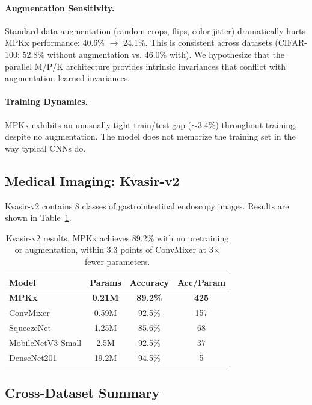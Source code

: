 \documentclass[11pt]{article}
\begin{document}
\paragraph{Augmentation Sensitivity.} Standard data augmentation (random crops, flips, color jitter) dramatically hurts MPKx performance: 40.6\% $\rightarrow$ 24.1\%. This is consistent across datasets (CIFAR-100: 52.8\% without augmentation vs. 46.0\% with). We hypothesize that the parallel M/P/K architecture provides intrinsic invariances that conflict with augmentation-learned invariances.

\paragraph{Training Dynamics.} MPKx exhibits an unusually tight train/test gap ($\sim$3.4\%) throughout training, despite no augmentation. The model does not memorize the training set in the way typical CNNs do.

\subsection{Medical Imaging: Kvasir-v2}

Kvasir-v2 contains 8 classes of gastrointestinal endoscopy images. Results are shown in Table~\ref{tab:kvasir}.

\begin{table}[h]
\centering
\begin{tabular}{lccc}
\toprule
\textbf{Model} & \textbf{Params} & \textbf{Accuracy} & \textbf{Acc/Param} \\
\midrule
\textbf{MPKx} & \textbf{0.21M} & \textbf{89.2\%} & \textbf{425} \\
ConvMixer & 0.59M & 92.5\% & 157 \\
SqueezeNet & 1.25M & 85.6\% & 68 \\
MobileNetV3-Small & 2.5M & 92.5\% & 37 \\
DenseNet201 & 19.2M & 94.5\% & 5 \\
\bottomrule
\end{tabular}
\caption{Kvasir-v2 results. MPKx achieves 89.2\% with no pretraining or augmentation, within 3.3 points of ConvMixer at 3$\times$ fewer parameters.}
\label{tab:kvasir}
\end{table}

\subsection{Cross-Dataset Summary}
\end{document}
